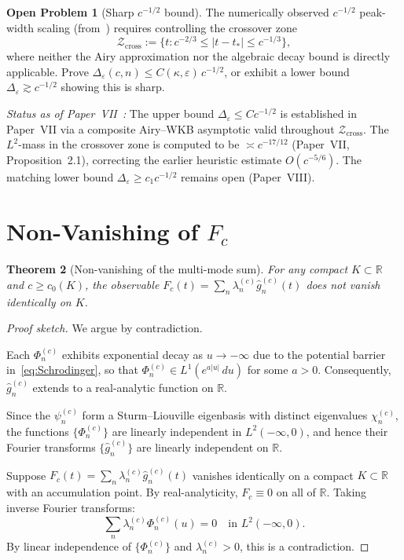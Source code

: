 \documentclass[12pt,a4paper]{amsart}
\newtheorem{theorem}{Theorem}[section]
\theoremstyle{definition}
\newtheorem{problem}[theorem]{Open Problem}
\theoremstyle{remark}
\begin{document}
\begin{problem}[Sharp $c^{-1/2}$ bound]
\label{prob:sharp-L2}
The numerically observed $c^{-1/2}$ peak-width scaling
(from~\cite{PaperV}) requires controlling the crossover zone
\[
\mathcal{Z}_{\mathrm{cross}} :=
\bigl\{t : c^{-2/3} \le |t - t_*| \le c^{-1/3}\bigr\},
\]
where neither the Airy approximation nor the algebraic decay
bound is directly applicable.
Prove $\Delta_\varepsilon(c,n) \le C(\kappa,\varepsilon)\,c^{-1/2}$,
or exhibit a lower bound $\Delta_\varepsilon \gtrsim c^{-1/2}$
showing this is sharp.

\emph{Status as of Paper~VII~\cite{PaperVII}:}
The upper bound $\Delta_\varepsilon \le C c^{-1/2}$ is
established in Paper~VII via a composite Airy--WKB asymptotic
valid throughout $\mathcal{Z}_{\mathrm{cross}}$.
The $L^2$-mass in the crossover zone is computed to be
$\asymp c^{-17/12}$ (Paper~VII, Proposition~2.1),
correcting the earlier heuristic estimate $O(c^{-5/6})$.
The matching lower bound $\Delta_\varepsilon \ge c_1 c^{-1/2}$
remains open (Paper~VIII).
\end{problem}

\section{Non-Vanishing of $F_c$}
\label{sec:nonvanishing}

\begin{theorem}[Non-vanishing of the multi-mode sum]
\label{thm:nonvanishing}
For any compact $K \subset \mathbb{R}$ and $c \ge c_0(K)$,
the observable $F_c(t) = \sum_n \lambda_n^{(c)}\widehat{g}_n^{(c)}(t)$
does not vanish identically on $K$.
\end{theorem}

\begin{proof}[Proof sketch]
We argue by contradiction.

Each $\Phi_n^{(c)}$ exhibits exponential decay as $u \to -\infty$
due to the potential barrier in~\eqref{eq:Schrodinger},
so that $\Phi_n^{(c)} \in L^1(e^{a|u|}\,du)$ for some $a > 0$.
Consequently, $\widehat{g}_n^{(c)}$ extends to a real-analytic
function on $\mathbb{R}$.

Since the $\psi_n^{(c)}$ form a Sturm--Liouville eigenbasis
with distinct eigenvalues $\chi_n^{(c)}$, the functions
$\{\Phi_n^{(c)}\}$ are linearly independent in $L^2(-\infty,0)$,
and hence their Fourier transforms $\{\widehat{g}_n^{(c)}\}$
are linearly independent on $\mathbb{R}$.

Suppose $F_c(t) = \sum_n \lambda_n^{(c)}\widehat{g}_n^{(c)}(t)$
vanishes identically on a compact $K \subset \mathbb{R}$
with an accumulation point.
By real-analyticity, $F_c \equiv 0$ on all of $\mathbb{R}$.
Taking inverse Fourier transforms:
\[
\sum_n \lambda_n^{(c)} \Phi_n^{(c)}(u) = 0
\quad \text{in } L^2(-\infty,0).
\]
By linear independence of $\{\Phi_n^{(c)}\}$ and
$\lambda_n^{(c)} > 0$, this is a contradiction.
\end{proof}
\end{document}
